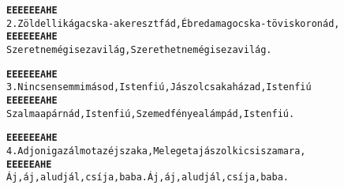 \newpage
{}
\kottastart
{}
\kottaend
\begin{minipage}{\textwidth}
\begin{alltt}
\textbf{    E          E       E         E   E          E        A    H   E}
2. Zöldellik ágacska - a keresztfád, Ébred a magocska - töviskoronád,
\textbf{     E       E    E       E     E          E    A  H    E}
   Szeretne mégis ez a világ, Szerethetne mégis ez a világ.
\end{alltt}
\vspace{0.0cm}
\versszakspacing
\end{minipage}
\begin{minipage}{\textwidth}
\begin{alltt}
\textbf{    E             E     E      E   E             E     A  H   E}
3. Nincsen semmi másod, Istenfiú, Jászol csak a házad, Istenfiú
\textbf{     E       E      E      E    E             E      A  H   E}
   Szalma a párnád, Istenfiú, Szemed fénye a lámpád, Istenfiú.
\end{alltt}
\vspace{0.0cm}
\versszakspacing
\end{minipage}
\begin{minipage}{\textwidth}
\begin{alltt}
\textbf{   E          E     E        E   E         E      A      H   E}
4. Adjon igaz álmot az éjszaka, Meleget a jászol kicsi szamara,
\textbf{   E       E          E          E       E          A H     E}
   Áj, áj, aludjál, csíja, baba. Áj, áj, aludjál, csíja, baba.
\end{alltt}
\vspace{0.0cm}
\versszakspacing
\end{minipage}
